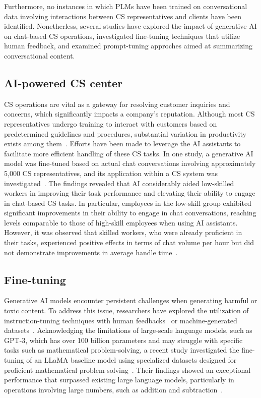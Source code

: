 \documentclass[sigconf]{acmart}
\begin{document}
Furthermore, no instances in which PLMs have been trained on conversational data involving interactions between CS representatives and clients have been identified. Nonetherless, several studies have explored the impact of generative AI on chat-based CS operations, investigated fine-tuning techniques that utilize human feedback, and examined prompt-tuning approches aimed at summarizing conversational content. 


\subsection{AI-powered CS center}  
CS operations are vital as a gateway for resolving customer inquiries and concerns, which significantly impacts a company's reputation. Although most CS representatives undergo training to interact with customers based on predetermined guidelines and procedures, substantial variation in productivity exists among them~\cite{syverson:2011}. Efforts have been made to leverage the AI assistants to facilitate more efficient handling of these CS tasks. In one study, a generative AI model was fine-tuned based on actual chat conversations involving approximately 5,000 CS representatives, and its application within a CS system was investigated~\cite{brynjolfsson2023generative}. The findings revealed that AI considerably aided low-skilled workers in improving their task performance and elevating their ability to engage in chat-based CS tasks. In particular, employees in the low-skill group exhibited significant improvements in their ability to engage in chat conversations, reaching levels comparable to those of high-skill employees when using AI assistants. However, it was observed that skilled workers, who were already proficient in their tasks, experienced positive effects in terms of chat volume per hour but did not demonstrate improvements in average handle time~\cite{brynjolfsson2023generative}.




\subsection{Fine-tuning}
Generative AI models encounter persistent challenges when generating harmful or toxic content. To address this issue, researchers have explored the utilization of instruction-tuning techniques with human feedbacks~\cite{ouyang2022training} or machine-generated datasets~\cite{peng2023instruction, wang2023selfinstruct}. Acknowledging the limitations of large-scale language models, such as GPT-3, which has over 100 billion parameters and may struggle with specific tasks such as mathematical problem-solving, a recent study investigated the fine-tuning of an LLaMA baseline model using specialized datasets designed for proficient mathematical problem-solving~\cite{liu2023goat}. Their findings showed an exceptional performance that surpassed existing large language models, particularly in operations involving large numbers, such as addition and subtraction~\cite{liu2023goat}. 
\end{document}
